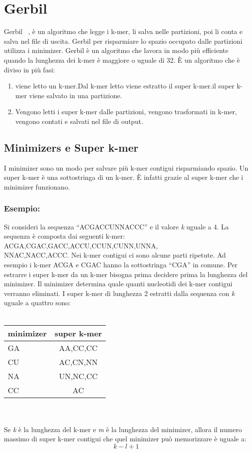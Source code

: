 \section{Gerbil}\label{sec:gerbil}
Gerbil~\cite{gerbil} ,
\`e un algoritmo che legge i k-mer, li salva nelle partizioni, poi li conta e salva nel file di uscita.
Gerbil per risparmiare lo spazio occupato dalle partizioni utilizza i minimizer.
Gerbil \`e un algoritmo che lavora in modo pi\`u efficiente quando la lunghezza dei k-mer \`e maggiore o uguale di 32.
\`E un algoritmo che \`e diviso in pi\`u fasi:
\begin{enumerate}
    \item viene letto un k-mer.Dal k-mer letto viene estratto il super k-mer.il super k-mer viene salvato in una partizione.
    \item Vengono letti i super k-mer dalle partizioni, vengono trasformati in k-mer, vengono contati e salvati nel file di output.
\end{enumerate}
\subsection{Minimizers e Super k-mer}\label{subsec:minimizers-e-super-k-mer}
I minimizer sono un modo per salvare pi\`u k-mer contigui risparmiando spazio.
Un super k-mer \`e una sottostringa di un k-mer.
\`E infatti grazie al super k-mer che i minimizer funzionano.
\subsubsection{Esempio:}
Si consideri la sequenza ``ACGACCUNNACCC'' e il valore \textit{k }uguale a 4.
La sequenza \`e composta dai seguenti k-mer:
ACGA,CGAC,GACC,ACCU,CCUN,CUNN,UNNA,\\
NNAC,NACC,ACCC.
Nei k-mer contigui ci sono alcune parti ripetute.
Ad esempio i k-mer ACGA e CGAC hanno la sottostringa ``CGA'' in comune.
Per estrarre i super k-mer da un k-mer bisogna prima decidere prima la lunghezza del minimizer.
Il minimizer determina quale quanti nucleotidi dei k-mer contigui verranno eliminati.
I super k-mer di lunghezza 2 estratti dalla sequenza con \textit{k }uguale a quattro sono:\\ \\
\begin{tabular}{|l|c|}
    \hline
    \textbf{minimizer} & \textbf{super k-mer}\\
    \hline
    GA & AA,CC,CC\\
    \hline
    CU & AC,CN,NN\\
    \hline
    NA & UN,NC,CC\\
    \hline
    CC & AC\\
    \hline
\end{tabular}
\\ \\
Se \textit{k } \`e la lunghezza del k-mer e \textit{m } \`e la lunghezza del minimizer, allora il numero massimo di super k-mer contigui che quel minimizer pu\`o memorizzare \`e uguale a:
\begin{equation} \label{eq:skmersize}
    k - l + 1
\end{equation}
